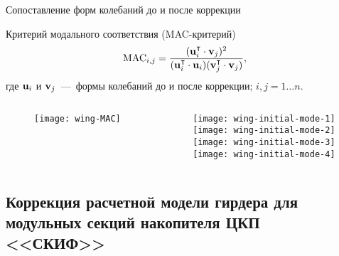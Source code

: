 \begin{frame}{Сопоставление форм колебаний до и после коррекции}
	\begin{block}{Критерий модального соответствия (MAC-критерий)}
		\begin{equation}
			\mathrm{MAC}_{i, j} = \frac{(\mathbf{u}_i ^ \intercal \cdot \mathbf{v}_j) ^ 2}{(\mathbf{u}_i ^ \intercal \cdot \mathbf{u}_i) (\mathbf{v}_j ^ \intercal \cdot \mathbf{v}_j)}, 
		\end{equation}
		где $ \mathbf{u}_i $ и $ \mathbf{v}_j $~---~формы колебаний до и после коррекции; $ i, j = 1 \hdots n $.
	\end{block}
	\vspace{-0.5em}
	\begin{columns}
		\begin{column}{0.49\textwidth}
			\centering
			\begin{figure}
				\texttt{[image: wing-MAC]}
			\end{figure}
		\end{column}
		\begin{column}{0.4\textwidth}
			\centering
			\begin{figure}
				\texttt{[image: wing-initial-mode-1]} \\ \vspace{0.2em}
				\texttt{[image: wing-initial-mode-2]} \\ \vspace{0.2em}
				\texttt{[image: wing-initial-mode-3]} \\ \vspace{0.2em}
				\texttt{[image: wing-initial-mode-4]}
			\end{figure}
		\end{column}
	\end{columns}
\end{frame}

\subsection{Коррекция расчетной модели гирдера для модульных секций накопителя ЦКП <<СКИФ>>}

